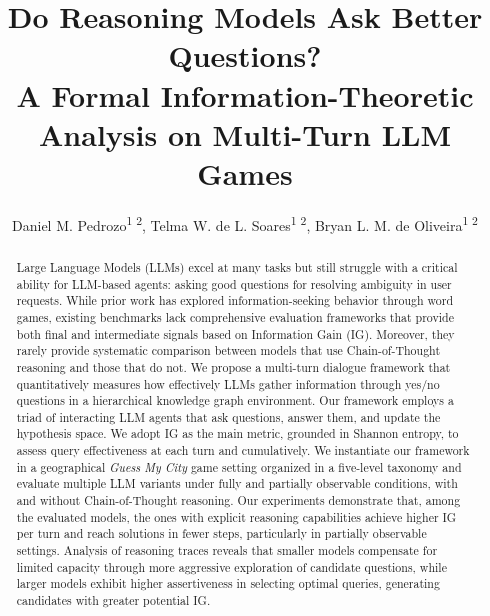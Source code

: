 \documentclass[letterpaper]{article} %
\title{Do Reasoning Models Ask Better Questions?\\A Formal Information-Theoretic Analysis on Multi-Turn LLM Games}
\author {
    Daniel M. Pedrozo\textsuperscript{\rm 1 2},
    Telma W. de L. Soares\textsuperscript{\rm 1 2},
    Bryan L. M. de Oliveira\textsuperscript{\rm 1 2}
}
\begin{document}
\maketitle

\begin{abstract}
Large Language Models (LLMs) excel at many tasks but still struggle with a critical ability for LLM-based agents: asking good questions for resolving ambiguity in user requests. While prior work has explored information-seeking behavior through word games, existing benchmarks lack comprehensive evaluation frameworks that provide both final and intermediate signals based on Information Gain (IG). Moreover, they rarely provide systematic comparison between models that use Chain-of-Thought reasoning and those that do not. We propose a multi-turn dialogue framework that quantitatively measures how effectively LLMs gather information through yes/no questions in a hierarchical knowledge graph environment. Our framework employs a triad of interacting LLM agents that ask questions, answer them, and update the hypothesis space. We adopt IG as the main metric, grounded in Shannon entropy, to assess query effectiveness at each turn and cumulatively. We instantiate our framework in a geographical \emph{Guess My City} game setting organized in a five-level taxonomy and evaluate multiple LLM variants under fully and partially observable conditions, with and without Chain-of-Thought reasoning. Our experiments demonstrate that, among the evaluated models, the ones with explicit reasoning capabilities achieve higher IG per turn and reach solutions in fewer steps, particularly in partially observable settings. Analysis of reasoning traces reveals that smaller models compensate for limited capacity through more aggressive exploration of candidate questions, while larger models exhibit higher assertiveness in selecting optimal queries, generating candidates with greater potential IG.
\end{abstract}

\begin{links}
\end{links}
\end{document}
